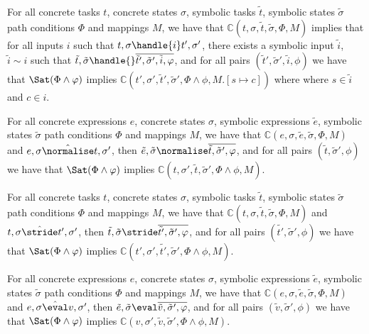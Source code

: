 \begin{lemma}
  \label{lem:completeHandle}
  For all concrete tasks $t$, concrete states $\sigma$, symbolic tasks $\tilde{t}$, symbolic states $\tilde{\sigma}$ path conditions $\Phi$ and mappings $M$,
  we have that $\mathds{C}(t,\sigma,\tilde{t},\tilde{\sigma},\Phi,M)$ implies
  that for all inputs $i$ such that $t,\sigma\handle{i}t',\sigma'$,
  there exists a symbolic input $\tilde{i}$, $\tilde{i}\sim i$ such that
  $\tilde{t},\tilde{\sigma}\handle{}\overline{\tilde{t}',\tilde{\sigma}',\tilde{i},\phi}$,
  and for all pairs $(\tilde{t}',\tilde{\sigma}',\tilde{i},\phi)$ we have that $\Sat(\Phi\land\phi)$ implies $\mathds{C}(t',\sigma',\tilde{t}',\tilde{\sigma}',\Phi\land\phi,M.[s\mapsto c])$ where where $s\in\tilde{i}$ and $c\in i$.
\end{lemma}

\begin{lemma}
  \label{lem:completeNormalise}
  For all concrete expressions $e$, concrete states $\sigma$, symbolic expressions $\tilde{e}$, symbolic states $\tilde{\sigma}$ path conditions $\Phi$ and mappings $M$,
  we have that $\mathds{C}(e,\sigma,\tilde{e},\tilde{\sigma},\Phi,M)$
  and $e,\sigma\hat{\normalise} t,\sigma'$,
  then $\tilde{e},\tilde{\sigma}\normalise\overline{\tilde{t},\tilde{\sigma}',\phi}$,
  and for all pairs $(\tilde{t},\tilde{\sigma}',\phi)$ we have that $\Sat(\Phi\land\phi)$ implies $\mathds{C}(t,\sigma',\tilde{t},\tilde{\sigma}',\Phi\land\phi,M)$.
\end{lemma}

\begin{lemma}
  \label{lem:completeStride}
  For all concrete tasks $t$, concrete states $\sigma$, symbolic tasks $\tilde{t}$, symbolic states $\tilde{\sigma}$ path conditions $\Phi$ and mappings $M$,
  we have that $\mathds{C}(t,\sigma,\tilde{t},\tilde{\sigma},\Phi,M)$
  and $t,\sigma\hat{\stride} t',\sigma'$,
  then $\tilde{t},\tilde{\sigma}\stride\overline{\tilde{t'},\tilde{\sigma}',\phi}$,
  and for all pairs $(\tilde{t'},\tilde{\sigma}',\phi)$ we have that $\Sat(\Phi\land\phi)$ implies $\mathds{C}(t',\sigma',\tilde{t'},\tilde{\sigma}',\Phi\land\phi,M)$.
\end{lemma}

\begin{lemma}
  \label{lem:completeEval}
  For all concrete expressions $e$, concrete states $\sigma$, symbolic expressions $\tilde{e}$, symbolic states $\tilde{\sigma}$ path conditions $\Phi$ and mappings $M$,
  we have that $\mathds{C}(e,\sigma,\tilde{e},\tilde{\sigma},\Phi,M)$
  and $e,\sigma\hat{\eval} v,\sigma'$,
  then $\tilde{e},\tilde{\sigma}\eval\overline{\tilde{v},\tilde{\sigma}',\phi}$,
  and for all pairs $(\tilde{v},\tilde{\sigma}',\phi)$ we have that $\Sat(\Phi\land\phi)$ implies $\mathds{C}(v,\sigma',\tilde{v},\tilde{\sigma}',\Phi\land\phi,M)$.
\end{lemma}

